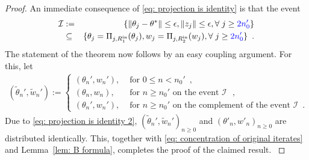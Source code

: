 \documentclass[usenames,dvipsnames,final,12pt]{colt2018} %
\newcommand{\Rti}{R_1^{\textrm{in}}}
\newcommand{\thS}{\theta^*}
\newcommand{\Rzi}{R_2^{\textrm{in}}}
\newcommand{\norm}[1]{\left\lVert#1\right\rVert}
\begin{document}
\begin{proof}
{
An immediate consequence of \eqref{eq: projection is identity} is that the event
\begin{eqnarray}
\mathcal{I} & := & \{\norm{\theta_j - \thS} \leq \epsilon, \norm{z_j} \leq \epsilon, \forall\; j \geq \textcolor{blue}{2n_0'}\} \notag
\\
& \subseteq &
\{\theta_{j} = \Pi_{j,\Rti}(\theta_{j}), w_{j}=\Pi_{j,\Rzi}(w_{j}), \forall\; j \geq \textcolor{blue}{2n_0'}\} \enspace. \label{eq: projection is identity 2}
\end{eqnarray}
The statement of the theorem now follows by an easy coupling argument.
For this, let
\begin{align}
(\tilde{\theta}_{n}',\tilde{w}_{n}')
:=
\begin{cases}
({\theta}_n',{w}_n'), & \mbox{ for } 0 \leq n < n_0' \enspace,\\
({\theta}_n,{w}_n), & \mbox { for } n \geq n_0' \mbox{ on the event $\mathcal{I}$ },\\
({\theta}_n',{w}_n'), & \mbox{ for } n \geq  n_0' \mbox{ on the complement of the event $\mathcal{I}\enspace.$ }
\end{cases}
\end{align}
%
Due to \eqref{eq: projection is identity 2}, $(\tilde{\theta}_n',\tilde{w}_n')_{n\geq 0}$ and $(\theta'_n, w'_n)_{n\geq 0}$ are distributed identically.
This, together with \eqref{eq: concentration of original iterates} and Lemma~\ref{lem: B formula}, completes the proof of the claimed result.
}
\end{proof}
\end{document}
